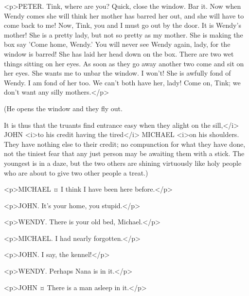 \begin{drama}
<p>PETER. Tink, where are you? Quick, close the window.
Bar it.
Now when Wendy comes she will think her mother has barred her out, and she will have to come back to me!
Now, Tink, you and I must go out by the door.
It is Wendy's mother!
She is a pretty lady, but not so pretty as my mother.
She is making the box say 'Come home, Wendy.' You will never see Wendy again, lady, for the window is barred!
She has laid her head down on the box. There are two wet things sitting on her eyes. As soon as they go away another two come and sit on her eyes.
She wants me to unbar the window. I won't! She is awfully fond of Wendy. I am fond of her too. We can't both have her, lady!
Come on, Tink; we don't want any silly mothers.</p>

\begin{stagedir}
(He opens the window and they fly out.

It is thus that the truants find entrance easy when they alight on the sill,</i> JOHN <i>to his credit having the tired</i> MICHAEL <i>on his shoulders. They have nothing else to their credit; no compunction for what they have done, not the tiniest fear that any just person may be awaiting them with a stick. The youngest is in a daze, but the two others are shining virtuously like holy people who are about to give two other people a treat.)
\end{stagedir}

<p>MICHAEL ¤
I think I have been here before.</p>

<p>JOHN. It's your home, you stupid.</p>

<p>WENDY. There is your old bed, Michael.</p>

<p>MICHAEL. I had nearly forgotten.</p>

<p>JOHN. I say, the kennel!</p>

<p>WENDY. Perhaps Nana is in it.</p>

<p>JOHN ¤
There is a man asleep in it.</p>


\end{drama}
